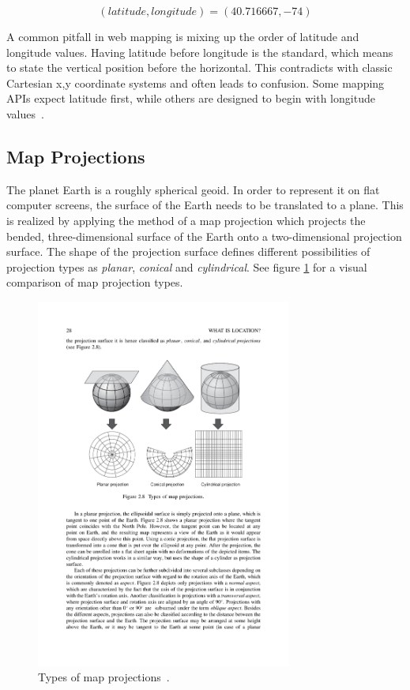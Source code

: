 \begin{itemize}
  \[ (latitude, longitude) = (40.716667, -74) \]

A common pitfall in web mapping is mixing up the order of latitude and longitude values. Having latitude before longitude is the standard, which means to state the vertical position before the horizontal. This contradicts with classic Cartesian x,y coordinate systems and often leads to confusion. Some mapping APIs expect latitude first, while others are designed to begin with longitude values~\cite{Kupper2005lbs, Zzolo11mappingdrupal}. 

\end{itemize}




\subsection{Map Projections}
\label{chapter:projections}

The planet Earth is a roughly spherical geoid. In order to represent it on flat computer screens, the surface of the Earth needs to be translated to a plane. This is realized by applying the method of a map projection which projects the bended, three-dimensional surface of the Earth onto a two-dimensional projection surface. The shape of the projection surface defines different possibilities of projection types as \textit{planar}, \textit{conical} and \textit{cylindrical}. See figure \ref{fig:map-projection-types} for a visual comparison of map projection types.

\begin{figure}[h]
  \begin{center}
    \includegraphics[width=0.75\textwidth]{figures/map_projection_types}
    \caption{Types of map projections~\cite[p 28]{Kupper2005lbs}.}
    \label{fig:map-projection-types}
  \end{center}
\end{figure}

